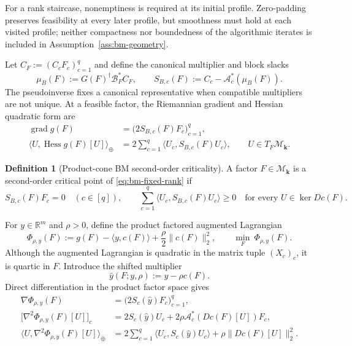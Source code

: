 \documentclass[11pt]{article}
\theoremstyle{definition}
\newtheorem{definition}{Definition}
\theoremstyle{remark}
\begin{document}
For a rank staircase, nonemptiness is required at its initial profile.
Zero-padding preserves feasibility at every later profile, but smoothness
must hold at each visited profile; neither compactness nor boundedness of the
algorithmic iterates is included in Assumption~\ref{ass:bm-geometry}.

Let $C_F:=(C_cF_c)_{c=1}^q$ and define the canonical multiplier and block
slacks
\begin{equation}
  \mu_B(F):=G(F)^\dagger\mathcal B_F^*C_F,
  \qquad
  S_{B,c}(F):=C_c-\mathcal A_c^*(\mu_B(F)).
  \label{eq:canonical-multiplier}
\end{equation}
The pseudoinverse fixes a canonical representative when compatible
multipliers are not unique.  At a feasible factor, the Riemannian gradient
and Hessian quadratic form are
\begin{align}
  \operatorname{grad}g(F)
  &=\bigl(2S_{B,c}(F)F_c\bigr)_{c=1}^q,
  \label{eq:bm-rgrad}\\
  \langle U,\operatorname{Hess}g(F)[U]\rangle_\oplus
  &=2\sum_{c=1}^q\langle U_c,S_{B,c}(F)U_c\rangle,
  \qquad U\in T_F\mathcal M_{\mathbf k}.
  \label{eq:bm-rhess}
\end{align}

\begin{definition}[Product-cone BM second-order criticality]
\label{def:bm-sosp}
A factor $F\in\mathcal M_{\mathbf k}$ is a second-order critical point of
\eqref{eq:bm-fixed-rank} if
\begin{equation}
  S_{B,c}(F)F_c=0\quad(c\in[q]),
  \qquad
  \sum_{c=1}^q\langle U_c,S_{B,c}(F)U_c\rangle\geq0
  \quad\text{for every }U\in\ker Dc(F).
  \label{eq:product-bm-sosp}
\end{equation}
\end{definition}

For $y\in\mathbb R^m$ and $\rho>0$, define the product factored augmented
Lagrangian
\begin{equation}
  \Phi_{\rho,y}(F)
  :=g(F)-\langle y,c(F)\rangle+\frac{\rho}{2}\|c(F)\|_2^2,
  \qquad
  \min_F\ \Phi_{\rho,y}(F).
  \label{eq:factored-AL-subproblem}
\end{equation}
Although the augmented Lagrangian is quadratic in the matrix tuple
$(X_c)_c$, it is quartic in $F$.  Introduce the shifted multiplier
\begin{equation}
  \widehat y(F;y,\rho):=y-\rho c(F).
  \label{eq:shifted-multiplier}
\end{equation}
Direct differentiation in the product factor space gives
\begin{align}
  \nabla\Phi_{\rho,y}(F)
  &=\bigl(2S_c(\widehat y)F_c\bigr)_{c=1}^q,
  \label{eq:AL-gradient}\\
  \bigl[\nabla^2\Phi_{\rho,y}(F)[U]\bigr]_c
  &=2S_c(\widehat y)U_c
    +2\rho\mathcal A_c^*\!\left(Dc(F)[U]\right)F_c,
  \label{eq:AL-HVP}\\
  \langle U,\nabla^2\Phi_{\rho,y}(F)[U]\rangle_\oplus
  &=2\sum_{c=1}^q\langle U_c,S_c(\widehat y)U_c\rangle
    +\rho\|Dc(F)[U]\|_2^2.
  \label{eq:AL-Hessian-form}
\end{align}
\end{document}
